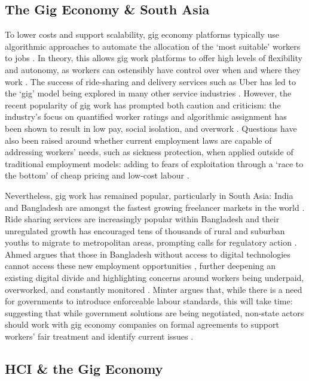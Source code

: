 \subsection{The Gig Economy \& South Asia}

To lower costs and support scalability, gig economy platforms typically use algorithmic approaches to automate the allocation of the `most suitable' workers to jobs \cite{Wood2019}. In theory, this allows gig work platforms to offer high levels of flexibility and autonomy, as workers can ostensibly have control over when and where they work \cite{Wood2019, Balaram2017, carlos2021}. The success of ride-sharing and delivery services such as Uber has led to the `gig' model being explored in many other service industries \cite{Balaram2017}. However, the recent popularity of gig work has prompted both caution and criticism: the industry's focus on quantified worker ratings and algorithmic assignment has been shown to result in low pay, social isolation, and overwork \cite{Wood2019}. Questions have also been raised around whether current employment laws are capable of addressing workers' needs, such as sickness protection, when applied outside of traditional employment models: adding to fears of exploitation through a `race to the bottom' of cheap pricing and low-cost labour \cite{Taylor2017,Balaram2017}. 

Nevertheless, gig work has remained popular, particularly in South Asia: India and Bangladesh are amongst the fastest growing freelancer markets in the world \cite{Payoneer2019}. Ride sharing services are increasingly popular within Bangladesh \cite{islam2019} and their unregulated growth has encouraged tens of thousands of rural and suburban youths to migrate to metropolitan areas, prompting calls for regulatory action \cite{Fairwork2021}. Ahmed argues that those in Bangladesh without access to digital technologies cannot access these new employment opportunities \cite{Ahmed2020}, further deepening an existing digital divide and highlighting concerns around workers being underpaid, overworked, and constantly monitored \cite{Irani2013}. Minter argues that, while there is a need for governments to introduce enforceable labour standards, this will take time: suggesting that while government solutions are being negotiated, non-state actors should work with gig economy companies on formal agreements to support workers' fair treatment and identify current issues \cite{Minter2017}.


\subsection{HCI \& the Gig Economy }

